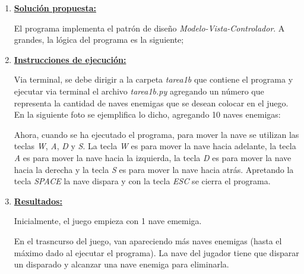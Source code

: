 \documentclass[letterpaper,11pt,oneside]{article}
\begin{document}
	





\begin{enumerate}
    \item \textbf{\underline{Solución propuesta:}} 

        El programa implementa el patrón de diseño \textit{Modelo-Vista-Controlador}. A grandes, la lógica del programa es la siguiente;

    \item \textbf{\underline{Instrucciones de ejecución:}} 

        Via terminal, se debe dirigir a la carpeta \textit{tarea1b} que contiene el programa y ejecutar via terminal el archivo \textit{tarea1b.py} agregando un número que representa la cantidad de naves enemigas que se desean colocar en el juego. En la siguiente foto se ejemplifica lo dicho, agregando 10 naves enemigas:



        Ahora, cuando se ha ejecutado el programa, para mover la nave se utilizan las teclas \textit{W}, \textit{A}, \textit{D} y \textit{S}. La tecla \textit{W} es para mover la nave hacia adelante, la tecla \textit{A} es para mover la nave hacia la izquierda, la tecla \textit{D} es para mover la nave hacia la derecha y la tecla \textit{S} es para mover la nave hacia atrás. Apretando la tecla \textit{SPACE} la nave dispara y con la tecla \textit{ESC} se cierra el programa.


    \item \textbf{\underline{Resultados:}} 

        Inicialmente, el juego empieza con 1 nave ememiga.

        En el trasncurso del juego, van apareciendo más naves enemigas (hasta el máximo dado al ejecutar el programa). La nave del jugador tiene que disparar un disparado y alcanzar una nave enemiga para eliminarla.


\end{enumerate}
\end{document}
